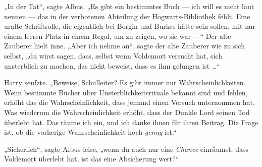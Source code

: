 „In der Tat“, sagte Albus.
„Es gibt ein bestimmtes Buch — ich will es nicht laut nennen — das in der verbotenen Abteilung der Hogwarts-Bibliothek fehlt. Eine uralte Schriftrolle, die eigentlich bei Borgin und Burkes hätte sein sollen, mit nur einem leeren Platz in einem Regal, um zu zeigen, wo sie war —“ Der alte Zauberer hielt inne.
„Aber ich nehme an“, sagte der alte Zauberer wie zu sich selbst,
„du wirst sagen, dass, selbst wenn Voldemort versucht hat, sich unsterblich zu machen, das nicht beweist, dass es ihm gelungen ist …“

Harry seufzte.
„Beweise, Schulleiter? Es gibt immer nur Wahrscheinlichkeiten. Wenn bestimmte Bücher über Unsterblichkeitsrituale bekannt sind und fehlen, erhöht das die Wahrscheinlichkeit, dass jemand einen Versuch unternommen hat. Was wiederum die Wahrscheinlichkeit erhöht, dass der Dunkle Lord seinen Tod überlebt hat. Das räume ich ein, und ich danke ihnen für ihren Beitrag. Die Frage ist, ob die vorherige Wahrscheinlichkeit hoch \emph{genug} ist.“

„Sicherlich“, sagte Albus leise, „wenn du auch nur eine \emph{Chance} einräumst, dass Voldemort überlebt hat, ist das eine Absicherung wert?“

